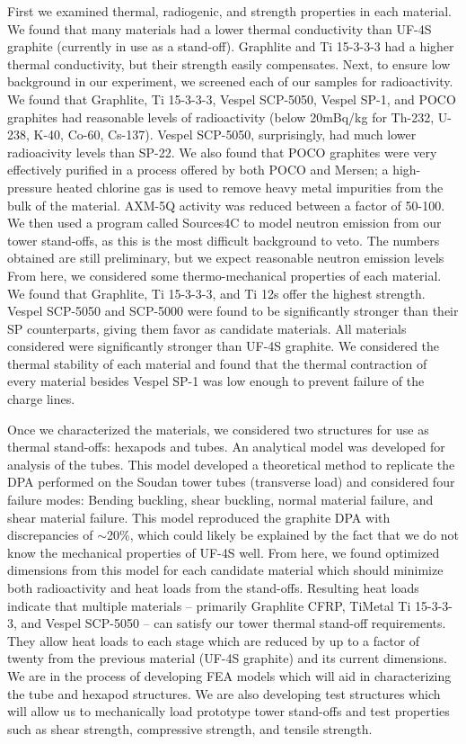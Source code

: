 \documentclass{report}
\begin{document}
First we examined thermal, radiogenic, and strength properties in each material. We found that many materials had a lower thermal conductivity than UF-4S graphite (currently in use as a stand-off). Graphlite and Ti 15-3-3-3 had a higher thermal conductivity, but their strength easily compensates. Next, to ensure low background in our experiment, we screened each of our samples for radioactivity. We found that Graphlite, Ti 15-3-3-3, Vespel SCP-5050, Vespel SP-1, and POCO graphites had reasonable levels of radioactivity (below 20mBq/kg for Th-232, U-238, K-40, Co-60, Cs-137). Vespel SCP-5050, surprisingly, had much lower radioacivity levels than SP-22. We also found that POCO graphites were very effectively purified in a process offered by both POCO and Mersen; a high-pressure heated chlorine gas is used to remove heavy metal impurities from the bulk of the material. AXM-5Q activity was reduced between a factor of 50-100. We then used a program called Sources4C to model neutron emission from our tower stand-offs, as this is the most difficult background to veto. The numbers obtained are still preliminary, but we expect reasonable neutron emission levels From here, we considered some thermo-mechanical properties of each material. We found that Graphlite, Ti 15-3-3-3, and Ti 12s offer the highest strength. Vespel SCP-5050 and SCP-5000 were found to be significantly stronger than their SP counterparts, giving them favor as candidate materials. All materials considered were significantly stronger than UF-4S graphite. We considered the thermal stability of each material and found that the thermal contraction of every material besides Vespel SP-1 was low enough to prevent failure of the charge lines.

Once we characterized the materials, we considered two structures for use as thermal stand-offs: hexapods and tubes. An analytical model was developed for analysis of the tubes. This model developed a theoretical method to replicate the DPA performed on the Soudan tower tubes (transverse load) and considered four failure modes: Bending buckling, shear buckling, normal material failure, and shear material failure. This model reproduced the graphite DPA with discrepancies of $\sim$20\%, which could likely be explained by the fact that we do not know the mechanical properties of UF-4S well. From here, we found optimized dimensions from this model for each candidate material which should minimize both radioactivity and heat loads from the stand-offs. Resulting heat loads indicate that multiple materials -- primarily Graphlite CFRP, TiMetal Ti 15-3-3-3, and Vespel SCP-5050 -- can satisfy our tower thermal stand-off requirements. They allow heat loads to each stage which are reduced by up to a factor of twenty from the previous material (UF-4S graphite) and its current dimensions. We are in the process of developing FEA models which will aid in characterizing the tube and hexapod structures. We are also developing test structures which will allow us to mechanically load prototype tower stand-offs and test properties such as shear strength, compressive strength, and tensile strength.
\end{document}
